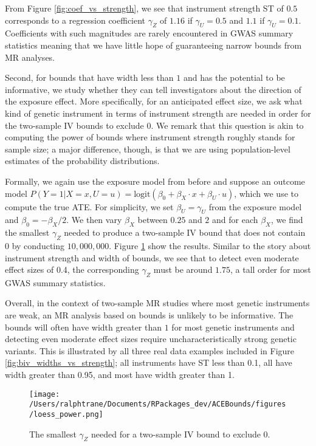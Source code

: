 \documentclass[
]{article}
\theoremstyle{plain}
\begin{document}
From Figure \ref{fig:coef_vs_strength}, we see that instrument strength ST of \(0.5\) corresponds to a regression coefficient \(\gamma_Z\) of \(1.16\) if \(\gamma_U = 0.5\) and \(1.1\) if \(\gamma_U = 0.1\). Coefficients with such magnitudes are rarely encountered in GWAS summary statistics meaning that we have little hope of guaranteeing narrow bounds from MR analyses.

Second, for bounds that have width less than \(1\) and has the potential to be informative, we study whether they can tell investigators about the direction of the exposure effect. More specifically, for an anticipated effect size, we ask what kind of genetic instrument in terms of instrument strength are needed in order for the two-sample IV bounds to exclude \(0\). We remark that this question is akin to computing the power of bounds where instrument strength roughly stands for sample size; a major difference, though, is that we are using population-level estimates of the probability distributions.

Formally, we again use the exposure model from before and suppose an outcome model \(P(Y = 1 | X = x, U = u) = \text{logit}(\beta_0 + \beta_X \cdot x + \beta_U \cdot u)\), which we use to compute the true ATE. For simplicity, we set \(\beta_U = \gamma_U\) from the exposure model and \(\beta_0 = -\beta_X/2\). We then vary \(\beta_X\) between \(0.25\) and \(2\) and for each \(\beta_X\), we find the smallest \(\gamma_Z\) needed to produce a two-sample IV bound that does not contain \(0\) by conducting \(10,000,000\). Figure \ref{fig:power_curves} show the results. Similar to the story about instrument strength and width of bounds, we see that to detect even moderate effect sizes of 0.4, the corresponding \(\gamma_Z\) must be around \(1.75\), a tall order for most GWAS summary statistics.

Overall, in the context of two-sample MR studies where most genetic instruments are weak, an MR analysis based on bounds is unlikely to be informative. The bounds will often have width greater than \(1\) for most genetic instruments and detecting even moderate effect sizes require uncharacteristically strong genetic variants. This is illustrated by all three real data examples included in Figure \ref{fig:biv_widths_vs_strength}; all instruments have ST less than 0.1, all have width greater than 0.95, and most have width greater than 1.

\begin{figure}[H]
  \centering
  \texttt{[image: /Users/ralphtrane/Documents/RPackages\_dev/ACEBounds/figures/loess\_power.png]}
  \caption{The smallest $\gamma_Z$ needed for a two-sample IV bound to exclude $0$.}
  \label{fig:power_curves}
\end{figure}
\end{document}
